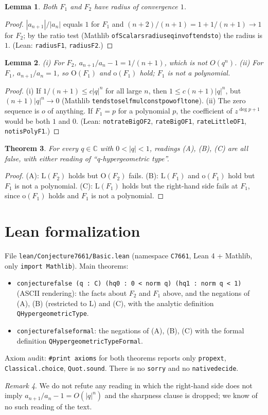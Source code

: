 \documentclass[11pt]{article}
\newtheorem{theorem}{Theorem}
\newtheorem{lemma}[theorem]{Lemma}
\theoremstyle{definition}
\theoremstyle{remark}
\newtheorem{remark}[theorem]{Remark}
\renewcommand{\_}{\oldus\allowbreak}
\begin{document}
\begin{lemma}
Both $F_1$ and $F_2$ have radius of convergence $1$.
\end{lemma}
\begin{proof}
$|a_{n+1}|/|a_n|$ equals $1$ for $F_1$ and $(n+2)/(n+1)=1+1/(n+1)\to1$ for $F_2$; by the ratio test
(Mathlib \texttt{ofScalars\_radius\_eq\_inv\_of\_tendsto}) the radius is $1$.
(Lean: \texttt{radius\_F1}, \texttt{radius\_F2}.)
\end{proof}

\begin{lemma}
(i) For $F_2$, $a_{n+1}/a_n-1=1/(n+1)$, which is not $O(q^n)$.
(ii) For $F_1$, $a_{n+1}/a_n=1$, so $\mathrm{O}(F_1)$ and $\mathrm{o}(F_1)$ hold; $F_1$ is not a polynomial.
\end{lemma}
\begin{proof}
(i) If $1/(n+1)\le c|q|^n$ for all large $n$, then $1\le c(n+1)|q|^n$, but $(n+1)|q|^n\to0$ (Mathlib
\texttt{tendsto\_self\_mul\_const\_pow\_of\_lt\_one}). (ii) The zero sequence is $o$ of anything. If
$F_1=p$ for a polynomial $p$, the coefficient of $z^{\deg p+1}$ would be both $1$ and $0$.
(Lean: \texttt{not\_rateBigO\_F2}, \texttt{rateBigO\_F1}, \texttt{rateLittleO\_F1}, \texttt{not\_isPoly\_F1}.)
\end{proof}

\begin{theorem}
For every $q\in\mathbb C$ with $0<|q|<1$, readings (A), (B), (C) are all false, with either reading of
``q-hypergeometric type''.
\end{theorem}
\begin{proof}
(A): $\mathrm{L}(F_2)$ holds but $\mathrm{O}(F_2)$ fails. (B): $\mathrm{L}(F_1)$ and $\mathrm{o}(F_1)$ hold
but $F_1$ is not a polynomial. (C): $\mathrm{L}(F_1)$ holds but the right-hand side fails at $F_1$, since
$\mathrm{o}(F_1)$ holds and $F_1$ is not a polynomial.
\end{proof}

\section{Lean formalization}

File \texttt{lean/Conjecture7661/Basic.lean} (namespace \texttt{C7661}, Lean 4 + Mathlib, only
\texttt{import Mathlib}). Main theorems:
\begin{itemize}
  \item \texttt{conjecture\_false (q : C) (\_hq0 : 0 < norm q) (hq1 : norm q < 1)} (ASCII rendering): the facts about $F_2$ and
        $F_1$ above, and the negations of (A), (B) (restricted to $\mathrm{L}$) and (C), with the analytic
        definition \texttt{QHypergeometricType}.
  \item \texttt{conjecture\_false\_formal}: the negations of (A), (B), (C) with the formal definition
        \texttt{QHypergeometricTypeFormal}.
\end{itemize}
Axiom audit: \texttt{\#print axioms} for both theorems reports only \texttt{propext},
\texttt{Classical.choice}, \texttt{Quot.sound}. There is no \texttt{sorry} and no \texttt{native\_decide}.

\begin{remark}
We do not refute any reading in which the right-hand side does not imply $a_{n+1}/a_n-1=O(|q|^n)$ and the
sharpness clause is dropped; we know of no such reading of the text.
\end{remark}
\end{document}
